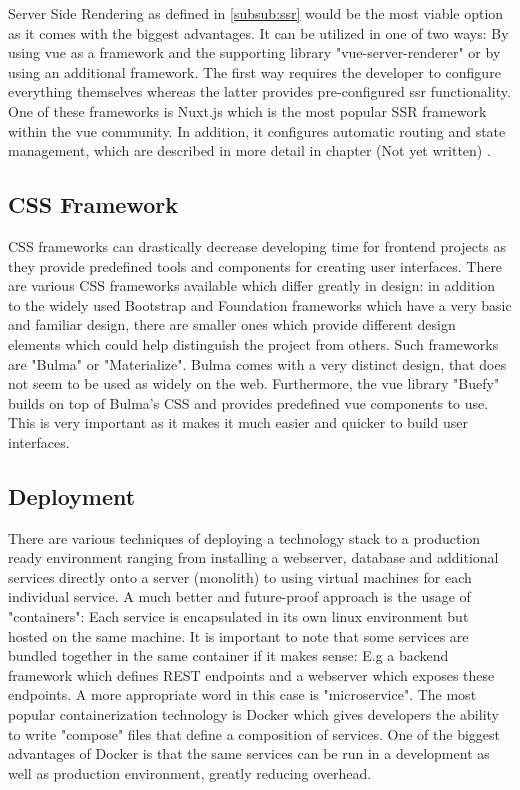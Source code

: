 Server Side Rendering as defined in \autoref{subsub:ssr} would be the most viable option as it comes with the biggest advantages. It can be utilized in one of two ways: By using vue as a framework and the supporting library "vue-server-renderer" or by using an additional framework. The first way requires the developer to configure everything themselves whereas the latter provides pre-configured \acrshort{ssr} functionality. One of these frameworks is Nuxt.js which is the most  popular SSR framework within the vue community. In addition, it configures automatic routing and state management, which are described in more detail in chapter (Not yet written) . 

\subsection{CSS Framework}
CSS frameworks can drastically decrease developing time for frontend projects as they provide predefined tools and components for creating user interfaces. There are various CSS frameworks available which differ greatly in design: in addition to the widely used Bootstrap and Foundation frameworks which have a very basic and familiar design, there are smaller ones which provide different design elements which could help distinguish the project from others. Such frameworks are "Bulma" or "Materialize". Bulma comes with a very distinct design, that does not seem to be used as widely on the web. Furthermore, the vue library "Buefy" builds on top of Bulma's CSS and provides predefined vue components to use. This is very important as it makes it much easier and quicker to build user interfaces.

\subsection{Deployment}
There are various techniques of deploying a technology stack to a production ready environment ranging from installing a webserver, database and additional services directly onto a server (monolith) to using virtual machines for each individual service. A much better and future-proof approach is the usage of "containers": Each service is encapsulated in its own linux environment but hosted on the same machine. It is important to note that some services are bundled together in the same container if it makes sense: E.g a backend framework which defines REST endpoints and a webserver which exposes these endpoints. A more appropriate word in this case is "microservice". The most popular containerization technology is Docker which gives developers the ability to write "compose" files that define a composition of services. One of the biggest advantages of Docker is that the same services can be run in a development as well as production environment, greatly reducing overhead.

